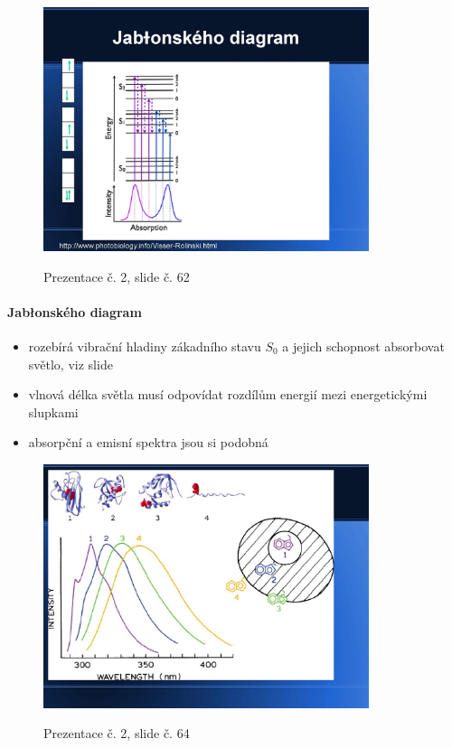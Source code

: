 \documentclass[DIV=8]{scrreprt}
\begin{document}
\begin{figure}
    \caption{Prezentace č. 2, slide č. 62}
    \includegraphics[width=0.85\textwidth]{slides-2/slide-62.jpg}
    \centering
    \label{slides-2-slide-62}
\end{figure}

\paragraph{Jabłonského diagram}
\begin{itemize}[nosep]
    \item rozebírá vibrační hladiny zákadního stavu \(S_0\) a jejich schopnost absorbovat světlo, viz slide
    \item vlnová délka světla musí odpovídat rozdílům energií mezi energetickými slupkami
    \item absorpční a emisní spektra jsou si podobná
\end{itemize}



\begin{figure}
    \caption{Prezentace č. 2, slide č. 64}
    \includegraphics[width=0.85\textwidth]{slides-2/slide-64.jpg}
    \centering
    \label{slides-2-slide-64}
\end{figure}
\end{document}

